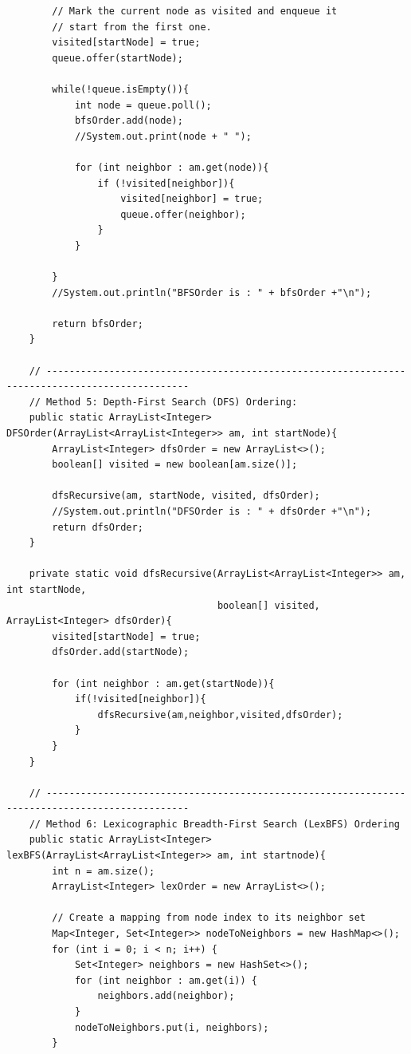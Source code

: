 \documentclass{article}
\begin{document}
\begin{verbatim}
        // Mark the current node as visited and enqueue it
        // start from the first one.
        visited[startNode] = true;
        queue.offer(startNode);

        while(!queue.isEmpty()){
            int node = queue.poll();
            bfsOrder.add(node);
            //System.out.print(node + " ");

            for (int neighbor : am.get(node)){
                if (!visited[neighbor]){
                    visited[neighbor] = true;
                    queue.offer(neighbor);
                }
            }

        }
        //System.out.println("BFSOrder is : " + bfsOrder +"\n");

        return bfsOrder;
    }

    // -----------------------------------------------------------------------------------------------
    // Method 5: Depth-First Search (DFS) Ordering:
    public static ArrayList<Integer> DFSOrder(ArrayList<ArrayList<Integer>> am, int startNode){
        ArrayList<Integer> dfsOrder = new ArrayList<>();
        boolean[] visited = new boolean[am.size()];

        dfsRecursive(am, startNode, visited, dfsOrder);
        //System.out.println("DFSOrder is : " + dfsOrder +"\n");
        return dfsOrder;
    }

    private static void dfsRecursive(ArrayList<ArrayList<Integer>> am, int startNode,
                                     boolean[] visited, ArrayList<Integer> dfsOrder){
        visited[startNode] = true;
        dfsOrder.add(startNode);

        for (int neighbor : am.get(startNode)){
            if(!visited[neighbor]){
                dfsRecursive(am,neighbor,visited,dfsOrder);
            }
        }
    }

    // -----------------------------------------------------------------------------------------------
    // Method 6: Lexicographic Breadth-First Search (LexBFS) Ordering
    public static ArrayList<Integer> lexBFS(ArrayList<ArrayList<Integer>> am, int startnode){
        int n = am.size();
        ArrayList<Integer> lexOrder = new ArrayList<>();

        // Create a mapping from node index to its neighbor set
        Map<Integer, Set<Integer>> nodeToNeighbors = new HashMap<>();
        for (int i = 0; i < n; i++) {
            Set<Integer> neighbors = new HashSet<>();
            for (int neighbor : am.get(i)) {
                neighbors.add(neighbor);
            }
            nodeToNeighbors.put(i, neighbors);
        }


\end{verbatim}
\end{document}
